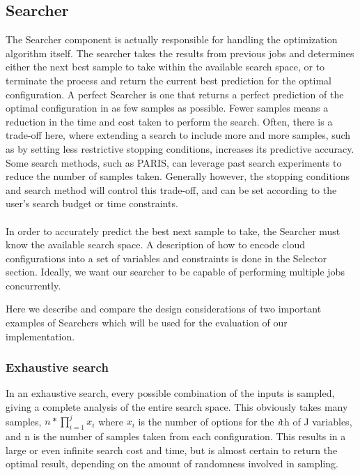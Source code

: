 \documentclass{report}
\begin{document}
\subsection{Searcher}
The Searcher component is actually responsible for handling the optimization algorithm itself. The searcher takes the results from previous jobs and determines either the next best sample to take within the available search space, or to terminate the process and return the current best prediction for the optimal configuration. A perfect Searcher is one that returns a perfect prediction of the optimal configuration in as few samples as possible. Fewer samples means a reduction in the time and cost taken to perform the search. Often, there is a trade-off here, where extending a search to include more and more samples, such as by setting less restrictive stopping conditions, increases its predictive accuracy. Some search methods, such as PARIS\cite{Yadwadkar2017}, can leverage past search experiments to reduce the number of samples taken. Generally however, the stopping conditions and search method will control this trade-off, and can be set according to the user's search budget or time constraints. 

\paragraph{}
In order to accurately predict the best next sample to take, the Searcher must know the available search space.  A description of how to encode cloud configurations into a set of variables and constraints is done in the Selector section. Ideally, we want our searcher to be capable of performing multiple jobs concurrently.
 
Here we describe and compare the design considerations of two important examples of Searchers which will be used for the evaluation of our implementation.

\subsubsection{Exhaustive search}
In an exhaustive search, every possible combination of the inputs is sampled, giving a complete analysis of the entire search space. This obviously takes many samples, $n * \prod_{i=1}^{j} x_{i}$ where $x_{i}$ is the number of options for the \textit{i}th of J variables, and n is the number of samples taken from each configuration. This results in a large or even infinite search cost and time, but is almost certain to return the optimal result, depending on the amount of randomness involved in sampling.
\end{document}
